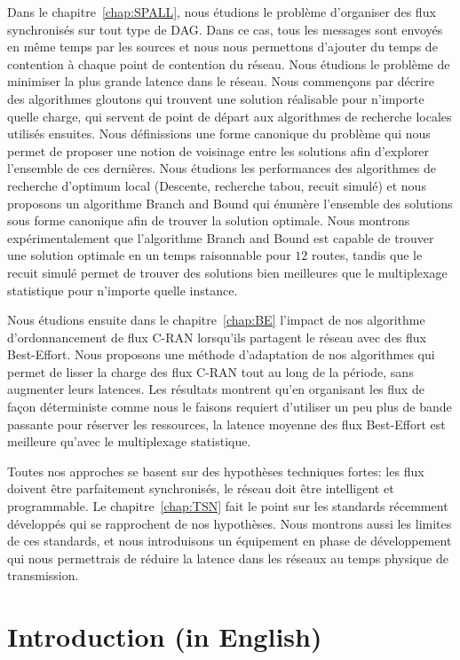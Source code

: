 Dans le chapitre~\ref{chap:SPALL}, nous étudions le problème d'organiser des flux synchronisés sur tout type de DAG. Dans ce cas, tous les messages sont envoyés en même temps par les sources et nous nous permettons d'ajouter du temps de contention à chaque point de contention du réseau. Nous étudions le problème de minimiser la plus grande latence dans le réseau. Nous commençons par décrire des algorithmes gloutons qui trouvent une solution réalisable pour n'importe quelle charge, qui servent de point de départ aux algorithmes de recherche locales utilisés ensuites. Nous définissions une forme canonique du problème qui nous permet de proposer une notion de voisinage entre les solutions afin d'explorer l'ensemble de ces dernières. Nous étudions les performances des algorithmes de recherche d'optimum local (Descente, recherche tabou, recuit simulé) et nous proposons un algorithme Branch and Bound qui énumère l'ensemble des solutions sous forme canonique afin de trouver la solution optimale. Nous montrons expérimentalement que l'algorithme Branch and Bound est capable de trouver une solution optimale en un temps raisonnable pour $12$ routes, tandis que le recuit simulé permet de trouver des solutions bien meilleures que le multiplexage statistique pour n'importe quelle instance.

Nous étudions ensuite dans le chapitre~\ref{chap:BE} l'impact de nos algorithme d'ordonnancement de flux C-RAN lorsqu'ils partagent le réseau avec des flux Best-Effort. Nous proposons une méthode d'adaptation de nos algorithmes qui permet de lisser la charge des flux C-RAN tout au long de la période, sans augmenter leurs latences. Les résultats montrent qu'en organisant les flux de façon déterministe comme nous le faisons requiert d'utiliser un peu plus de bande passante pour réserver les ressources, la latence moyenne des flux Best-Effort est meilleure qu'avec le multiplexage statistique.

Toutes nos approches se basent sur des hypothèses techniques fortes: les flux doivent être parfaitement synchronisés, le réseau doit être intelligent et programmable. Le chapitre~\ref{chap:TSN} fait le point sur les standards récemment développés qui se rapprochent de nos hypothèses. Nous montrons aussi les limites de ces standards, et nous introduisons un équipement en phase de développement qui nous permettrais de réduire la latence dans les réseaux au temps physique de transmission.




\chapter*{Introduction (in English)}
\label{chap:introen}


